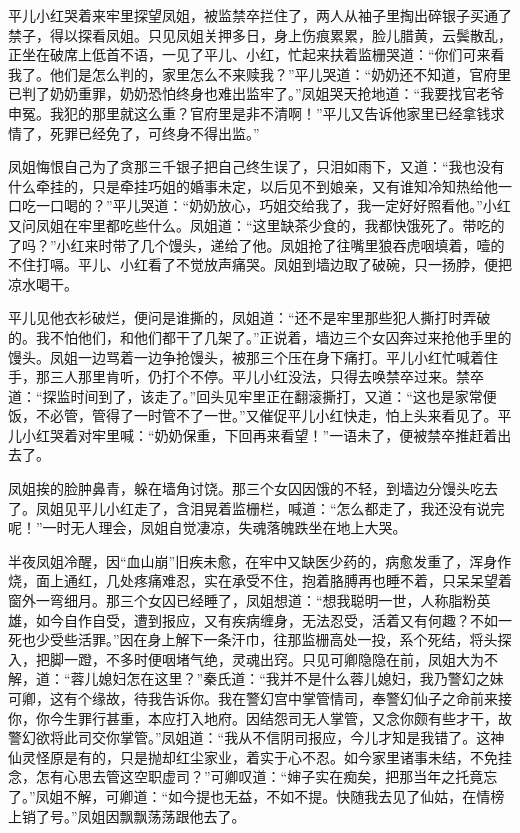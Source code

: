 \documentclass[12pt,oneside]{book}
\begin{document}
平儿小红哭着来牢里探望凤姐，被监禁卒拦住了，两人从袖子里掏出碎银子买通了禁子，得以探看凤姐。只见凤姐关押多日，身上伤痕累累，脸儿腊黄，云鬓散乱，正坐在破席上低首不语，一见了平儿、小红，忙起来扶着监栅哭道：“你们可来看我了。他们是怎么判的，家里怎么不来赎我？”平儿哭道：“奶奶还不知道，官府里已判了奶奶重罪，奶奶恐怕终身也难出监牢了。”凤姐哭天抢地道：“我要找官老爷申冤。我犯的那里就这么重？官府里是非不清啊！”平儿又告诉他家里已经拿钱求情了，死罪已经免了，可终身不得出监。”

凤姐悔恨自己为了贪那三千银子把自己终生误了，只泪如雨下，又道：“我也没有什么牵挂的，只是牵挂巧姐的婚事未定，以后见不到娘亲，又有谁知冷知热给他一口吃一口喝的？”平儿哭道：“奶奶放心，巧姐交给我了，我一定好好照看他。”小红又问凤姐在牢里都吃些什么。凤姐道：“这里缺茶少食的，我都快饿死了。带吃的了吗？”小红来时带了几个馒头，递给了他。凤姐抢了往嘴里狼吞虎咽填着，噎的不住打嗝。平儿、小红看了不觉放声痛哭。凤姐到墙边取了破碗，只一扬脖，便把凉水喝干。

平儿见他衣衫破烂，便问是谁撕的，凤姐道：“还不是牢里那些犯人撕打时弄破的。我不怕他们，和他们都干了几架了。”正说着，墙边三个女囚奔过来抢他手里的馒头。凤姐一边骂着一边争抢馒头，被那三个压在身下痛打。平儿小红忙喊着住手，那三人那里肯听，仍打个不停。平儿小红没法，只得去唤禁卒过来。禁卒道：“探监时间到了，该走了。”回头见牢里正在翻滚撕打，又道：“这也是家常便饭，不必管，管得了一时管不了一世。”又催促平儿小红快走，怕上头来看见了。平儿小红哭着对牢里喊：“奶奶保重，下回再来看望！”一语未了，便被禁卒推赶着出去了。

凤姐挨的脸肿鼻青，躲在墙角讨饶。那三个女囚因饿的不轻，到墙边分馒头吃去了。凤姐见平儿小红走了，含泪晃着监栅栏，喊道：“怎么都走了，我还没有说完呢！”一时无人理会，凤姐自觉凄凉，失魂落魄跌坐在地上大哭。

半夜凤姐冷醒，因“血山崩”旧疾未愈，在牢中又缺医少药的，病愈发重了，浑身作烧，面上通红，几处疼痛难忍，实在承受不住，抱着胳膊再也睡不着，只呆呆望着窗外一弯细月。那三个女囚已经睡了，凤姐想道：“想我聪明一世，人称脂粉英雄，如今自作自受，遭到报应，又有疾病缠身，无法忍受，活着又有何趣？不如一死也少受些活罪。”因在身上解下一条汗巾，往那监栅高处一投，系个死结，将头探入，把脚一蹬，不多时便咽堵气绝，灵魂出窍。只见可卿隐隐在前，凤姐大为不解，道：“蓉儿媳妇怎在这里？”秦氏道：“我并不是什么蓉儿媳妇，我乃警幻之妹可卿，这有个缘故，待我告诉你。我在警幻宫中掌管情司，奉警幻仙子之命前来接你，你今生罪行甚重，本应打入地府。因结怨司无人掌管，又念你颇有些才干，故警幻欲将此司交你掌管。”凤姐道：“我从不信阴司报应，今儿才知是我错了。这神仙灵怪原是有的，只是抛却红尘家业，着实于心不忍。如今家里诸事未结，不免挂念，怎有心思去管这空职虚司？”可卿叹道：“婶子实在痴矣，把那当年之托竟忘了。”凤姐不解，可卿道：“如今提也无益，不如不提。快随我去见了仙姑，在情榜上销了号。”凤姐因飘飘荡荡跟他去了。
\end{document}
